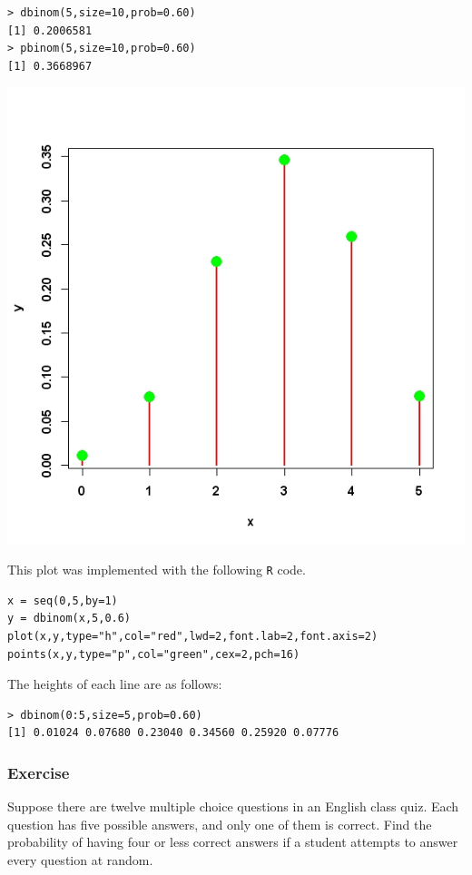 \documentclass[a4paper,12pt]{article}
\begin{document}
\begin{verbatim}
> dbinom(5,size=10,prob=0.60)
[1] 0.2006581
> pbinom(5,size=10,prob=0.60)
[1] 0.3668967
\end{verbatim}

 \begin{center}
 \includegraphics[scale=0.50]{dbinomPlot}
 \end{center}
 
This plot was implemented with the following \texttt{R} code.

\begin{verbatim}
x = seq(0,5,by=1)
y = dbinom(x,5,0.6)
plot(x,y,type="h",col="red",lwd=2,font.lab=2,font.axis=2)
points(x,y,type="p",col="green",cex=2,pch=16)
\end{verbatim}

The heights of each line are as follows:
\begin{verbatim}
> dbinom(0:5,size=5,prob=0.60)
[1] 0.01024 0.07680 0.23040 0.34560 0.25920 0.07776
\end{verbatim}

\subsubsection{Exercise}
Suppose there are twelve multiple choice questions in an English class quiz. Each question has five possible answers, and only one of them is correct. Find the probability of having four or less correct answers if a student attempts to answer every question at random. 
\end{document}
